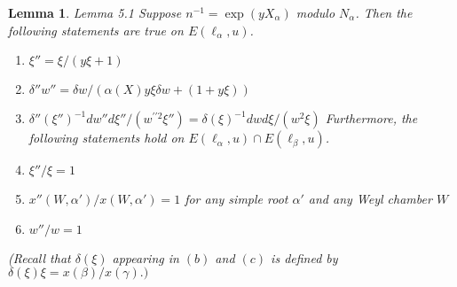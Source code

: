 \documentclass{memo-l}
\newtheorem{lemma}[theorem]{Lemma}
\theoremstyle{definition}
\theoremstyle{remark}
\numberwithin{section}{chapter}
\numberwithin{equation}{chapter}
\begin{document}
\begin{lemma}{Lemma 5.1} Suppose $n^{-1} = \exp(yX_{{\alpha}})$ modulo
$N_{{\alpha}}$.  Then the following statements are true on
$E({\ell}_{{\alpha}},u)$.

\medskip
\begin{enumerate}[label=\alph*)]
\item ${\xi}'' = {\xi}/(y{\xi}+1)$
\smallskip
\item ${\delta}''w'' = {\delta}w/({\alpha}(X)y{\xi}{\delta}w + (1+y{\xi}))$
\smallskip
\item ${\delta}''({\xi}'')^{-1}dw''d{\xi''}/(w^{\prime\prime2}{\xi''}) =
{\delta}({\xi})^{-1}dwd{\xi}/(w^{2}{\xi})$
\medskip
Furthermore, the following statements hold on $E({\ell}_{{\alpha}},u)
\cap E({\ell}_{{\beta}},u)$.
\smallskip        
\item ${\xi}''/{\xi} = 1$
\smallskip        
\item $x''(W,{\alpha}')/x(W,{\alpha}') = 1$ for any simple root ${\alpha}'$ and
any Weyl chamber $W$
\smallskip
\item $w''/w = 1$
\end{enumerate}
\smallskip
\noindent
(Recall that ${\delta}({\xi})$ appearing in $(b)$ and $(c)$ is defined by
${\delta}({\xi}){\xi} = x({\beta})/x({\gamma}).)$
\end{lemma}
\end{document}
